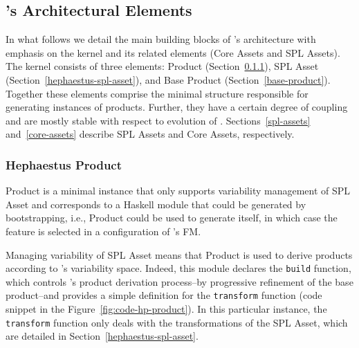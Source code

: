 
\subsection{\hpl's Architectural Elements} \label{architectural-elements-hpl}

In what follows we detail the main building blocks of \hpl{}'s architecture with emphasis on the kernel and its related elements (Core Assets and SPL Assets).  The kernel consists of three elements: \hp{} Product (Section~\ref{hephaestus-product}), \hp{} SPL Asset (Section~\ref{hephaestus-spl-asset}), and Base Product (Section~\ref{base-product}). Together these elements comprise the minimal structure responsible for generating instances of \hpl{} products. Further, they have a certain degree of coupling and are mostly stable with respect to evolution of \hpl{}. Sections~\ref{spl-assets} and~\ref{core-assets} describe SPL Assets and Core Assets, respectively.


\subsubsection{Hephaestus Product} \label{hephaestus-product}

\hp{} Product is a minimal \hpl{} instance that only supports variability management of \hp{} SPL Asset and corresponds to a Haskell module that could be generated by bootstrapping, i.e., \hp{} Product could be used to generate itself, in which case the \hp{} feature is selected in a configuration of \hpl's FM.

Managing variability of \hp{} SPL Asset means that \hp{} Product is used to derive products according to \hpl{}'s variability space. Indeed, this module declares the \texttt{build} function, which controls \hpl{}'s product derivation process--by progressive refinement of the base product--and provides a simple definition for the \texttt{transform} function (code snippet in the Figure~\ref{fig:code-hp-product}).  In this particular instance, the \texttt{transform} function only deals with the transformations of the \hp{} SPL Asset, which are detailed in Section~\ref{hephaestus-spl-asset}.


